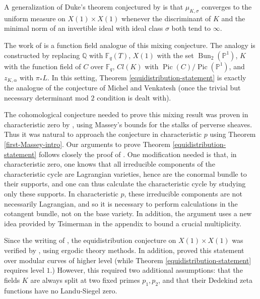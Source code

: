 \documentclass[12pt]{amsart}
\theoremstyle{definition}
\theoremstyle{remark}
\begin{document}
A generalization of Duke's theorem conjectured by \citet[Conjecture 2 on p. 7]{MVUnpublished} is that $\mu_{K,\sigma}$ converges to the uniform measure on $X(1) \times X(1)$ whenever the discriminant of $K$ and the minimal norm of an 
invertible ideal with ideal class $\sigma$ both tend to $\infty$. 

The work of \citet{TS} is a function field analogue of this mixing conjecture. The analogy is constructed by replacing $\mathbb Q$ with $\mathbb F_q(T)$, $X(1)$ with the set $\operatorname{Bun}_2(\mathbb P^1)$, $K$ with the function field of $C$ over $\mathbb F_q$, $Cl(K)$ with $\operatorname{Pic}(C) / \operatorname{Pic}( \mathbb P^1)$, and $z_{K,\alpha}$ with $\pi_* L$. In this setting, Theorem \ref{equidistribution-statement} is exactly the analogue of the conjecture of Michel and Venkatesh (once the trivial but necessary determinant mod $2$ condition is dealt with).

The cohomological conjecture \citep[Conjecture 1.4]{TS} needed to prove this mixing result was proven in characteristic zero by \citet[Theorem 1.5]{TS}, using Massey's bounds for the stalks of perverse sheaves. Thus it was natural to approach the conjecture in characteristic $p$ using Theorem \ref{first-Massey-intro}. Our arguments to prove Theorem \ref{equidistribution-statement} follows closely the proof of \citep[Theorem 1.5]{TS}. One modification needed is that, in characteristic zero, one knows that all irreducible components of the characteristic cycle are Lagrangian varieties, hence are the conormal bundle to their supports, and one can thus calculate the characteristic cycle by studying only these supports. In characteristic $p$, these irreducible components are not necessarily Lagrangian, and so it is necessary to perform calculations in the cotangent bundle, not on the base variety. In addition, the argument uses a new idea provided by Tsimerman in the appendix to bound a crucial multiplicity. 




Since the writing of \citep{TS}, the equidistribution conjecture on $X(1) \times X(1)$ was verified by \citet[Theorem 1.3]{Khayutin}, using ergodic theory methods. In addition, \citet{Khayutin} proved this statement over modular curves of higher level (while Theorem \ref{equidistribution-statement} requires level $1$.) However, this required two additional assumptions: that the fields $K$ are always split at two fixed primes $p_1, p_2$, and that their Dedekind zeta functions have no Landu-Siegel zero.  
\end{document}

